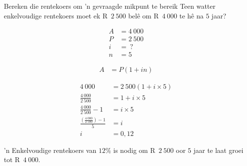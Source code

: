 \begin{wex}{Bereken die rentekoers om 'n gevraagde mikpunt te bereik}{
    Teen watter enkelvoudige rentekoers moet ek R~$2~500$ bel\^e om R~$4~000$ te h\^e na $5$ jaar?\\}{

    \begin{align*}
	A &= 4~000\\
	P &= 2~500\\
	i &= ~?\\
	n &= 5
    \end{align*}

    \begin{align*}
	A &= P(1 + in)
    \end{align*}

    \begin{align*}
	4~000 &= 2~500(1 + i \times 5)\\
	\frac{4~000}{2~500} &= 1 + i \times 5\\
	\frac{4~000}{2~500} - 1&= i \times 5\\
	\frac{(\frac{4~000}{2~500}) - 1}{5} &= i\\
	i &= 0,12
    \end{align*}

    'n Enkelvoudige rentekoers van $12\%$ is nodig om R~$2~500$ oor $5$ jaar te laat groei tot R~$4~000$.
    }
\end{wex}

% 
% 
% 


